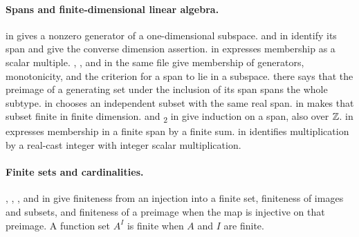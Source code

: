 \begin{mergedproofsection}
\paragraph{Spans and finite-dimensional linear algebra.}\label{facts:312-linear}\uses{}
\begingroup\raggedright
{} in
gives a nonzero generator of a one-dimensional subspace.
 and
 in
identify its span and give the converse dimension assertion.
 in
 expresses membership as a scalar multiple.
, , and
 in the same file give membership of generators,
monotonicity, and the criterion for a span to lie in a subspace.
 there says that the preimage of
a generating set under the inclusion of its span spans the whole subtype.
 in
chooses an independent subset with the same real span.
 in
makes that subset finite in finite dimension.
 and \textsubscript{2} in
give induction on a span, also over ${\mathbb Z}$.
 in
expresses membership in a finite span by a finite sum.
 in
 identifies multiplication by
a real-cast integer with integer scalar multiplication.
\par\endgroup

\paragraph{Finite sets and cardinalities.}\label{facts:312-finite}\uses{}
\begingroup\raggedright
{}, ,
, and  in
 give finiteness from an
injection into a finite set, finiteness of images and subsets, and
finiteness of a preimage when the map is injective on that preimage.
A function set $A^I$ is finite when $A$ and $I$ are finite.
\par\endgroup


\end{mergedproofsection}
